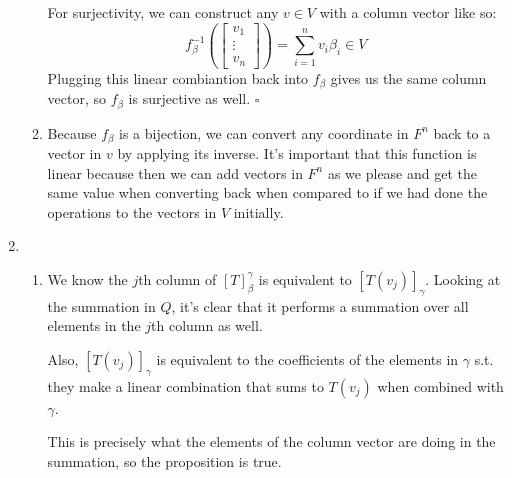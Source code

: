 \documentclass[12pt]{article}
\begin{document}
\begin{enumerate}
\begin{enumerate}
                        For surjectivity, we can construct any $v \in V$ with a column vector like so:
                        \[f^{-1}_\beta\left(\begin{bmatrix}
                                          v_1    \\
                                          \vdots \\
                                          v_n
                                    \end{bmatrix}\right)=\sum_{i=1}^{n} v_i \beta_i \in V\]
                        Plugging this linear combiantion back into $f_\beta$ gives us the same column vector, so $f_\beta$ is surjective as well. $\square$
                  \item Because $f_\beta$ is a bijection, we can convert any coordinate in $F^n$ back to a vector in $v$ by applying its inverse.
                        It's important that this function is linear because then we can add vectors in $F^n$ as we please and get the same
                        value when converting back when compared to if we had done the operations to the vectors in $V$ initially.
            \end{enumerate}
            \pagebreak
      \item \begin{enumerate}
                  \item We know the $j$th column of $[T]^\gamma_\beta$ is equivalent to $[T(v_j)]_\gamma$.
                        Looking at the summation in $Q$, it's clear that it performs a summation over all elements in the $j$th column as well.
                        
                        Also, $[T(v_j)]_\gamma$ is equivalent to the coefficients of the elements in $\gamma$
                        s.t. they make a linear combination that sums to $T(v_j)$ when combined with $\gamma$.
                        
                        This is precisely what the elements of the column vector are doing in the summation, so
                        the proposition is true.


\end{enumerate}
\end{enumerate}
\end{document}
